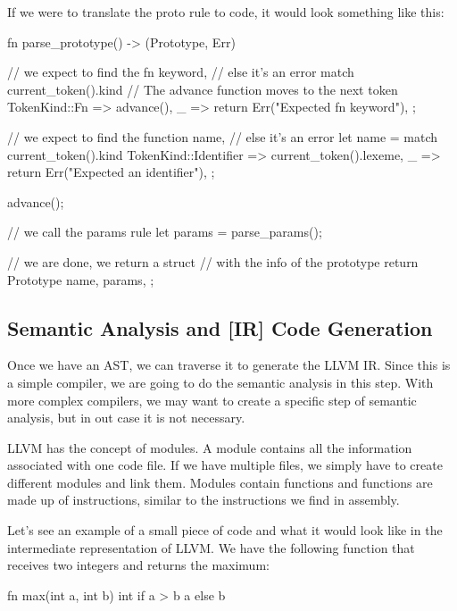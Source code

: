 ﻿\documentclass[10pt,a4paper,twocolumn,twoside]{article}
\begin{document}
If we were to translate the proto rule to code, it would look something like 
this:

\begin{scriptsize}
\begin{code}
fn parse_prototype() -> (Prototype, Err) {
    // we expect to find the fn keyword,
    // else it's an error
    match current_token().kind {
        // The advance function moves to the next token
        TokenKind::Fn => advance(),
        _ => return Err("Expected fn keyword"),
    };

    // we expect to find the function name,
    // else it's an error
    let name = match current_token().kind {
        TokenKind::Identifier => current_token().lexeme,
        _ => return Err("Expected an identifier"),
    };

    advance();

    // we call the params rule
    let params = parse_params();

    // we are done, we return a struct 
    // with the info of the prototype
    return Prototype { 
        name,
        params,
    };
}
\end{code}
\end{scriptsize}

\subsection{Semantic Analysis and [IR] Code Generation}
Once we have an AST, we can traverse it to generate the LLVM IR. Since this is a
simple compiler, we are going to do the semantic analysis in this step. With 
more complex compilers, we may want to create a specific step of semantic 
analysis, but in out case it is not necessary.

LLVM has the concept of modules. A module contains all the information
associated with one code file. If we have multiple files, we simply have to
create different modules and link them. Modules contain functions and functions
are made up of instructions, similar to the instructions we find in assembly.

Let's see an example of a small piece of code and what it would look like in the
intermediate representation of LLVM. We have the following function that
receives two integers and returns the maximum:

\begin{code}
fn max(int a, int b) int {
    if a > b { a } else { b }
}
\end{code}
\end{document}
